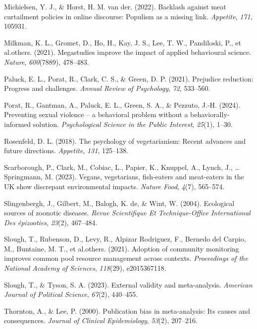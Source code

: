 \documentclass[
  man]{apa6}
\newlength{\cslhangindent}
\newenvironment{CSLReferences}[2] %
 {\begin{list}{}{%
  \setlength{\itemindent}{0pt}
  \setlength{\leftmargin}{0pt}
  \setlength{\parsep}{0pt}
  \ifodd #1
   \setlength{\leftmargin}{\cslhangindent}
   \setlength{\itemindent}{-1\cslhangindent}
  \fi
  \setlength{\itemsep}{#2\baselineskip}}}
 {\end{list}}
\begin{document}
\begin{CSLReferences}{1}{0}
Michielsen, Y. J., \& Horst, H. M. van der. (2022). Backlash against meat curtailment policies in online discourse: Populism as a missing link. \emph{Appetite}, \emph{171}, 105931.

Milkman, K. L., Gromet, D., Ho, H., Kay, J. S., Lee, T. W., Pandiloski, P., et al.others. (2021). Megastudies improve the impact of applied behavioural science. \emph{Nature}, \emph{600}(7889), 478--483.

Paluck, E. L., Porat, R., Clark, C. S., \& Green, D. P. (2021). Prejudice reduction: Progress and challenges. \emph{Annual Review of Psychology}, \emph{72}, 533--560.

Porat, R., Gantman, A., Paluck, E. L., Green, S. A., \& Pezzuto, J.-H. (2024). Preventing sexual violence -- a behavioral problem without a behaviorally-informed solution. \emph{Psychological Science in the Public Interest}, \emph{25}(1), 1--30.

Rosenfeld, D. L. (2018). The psychology of vegetarianism: Recent advances and future directions. \emph{Appetite}, \emph{131}, 125--138.

Scarborough, P., Clark, M., Cobiac, L., Papier, K., Knuppel, A., Lynch, J., \ldots{} Springmann, M. (2023). Vegans, vegetarians, fish-eaters and meat-eaters in the UK show discrepant environmental impacts. \emph{Nature Food}, \emph{4}(7), 565--574.

Slingenbergh, J., Gilbert, M., Balogh, K. de, \& Wint, W. (2004). Ecological sources of zoonotic diseases. \emph{Revue Scientifique Et Technique-Office International Des {é}pizooties}, \emph{23}(2), 467--484.

Slough, T., Rubenson, D., Levy, R., Alpizar Rodriguez, F., Bernedo del Carpio, M., Buntaine, M. T., et al.others. (2021). Adoption of community monitoring improves common pool resource management across contexts. \emph{Proceedings of the National Academy of Sciences}, \emph{118}(29), e2015367118.

Slough, T., \& Tyson, S. A. (2023). External validity and meta-analysis. \emph{American Journal of Political Science}, \emph{67}(2), 440--455.

Thornton, A., \& Lee, P. (2000). Publication bias in meta-analysis: Its causes and consequences. \emph{Journal of Clinical Epidemiology}, \emph{53}(2), 207--216.


\end{CSLReferences}
\end{document}
